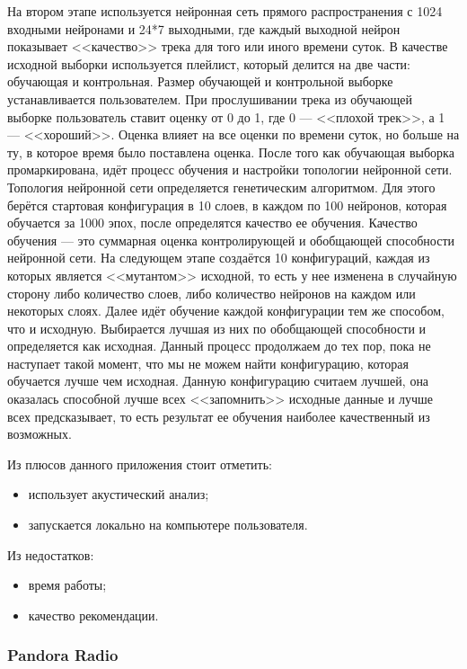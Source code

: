 На втором этапе используется нейронная сеть прямого распространения с 1024 входными нейронами и 24*7 выходными, где каждый выходной нейрон показывает <<качество>> трека для того или иного времени суток.  В качестве исходной выборки используется плейлист, который делится на две части: обучающая и контрольная. Размер обучающей и контрольной выборке устанавливается пользователем. При прослушивании трека из обучающей выборке пользователь ставит оценку от 0 до 1, где 0 — <<плохой трек>>, а 1 — <<хороший>>. Оценка влияет на все оценки по времени суток, но больше на ту, в которое время было поставлена оценка.  После того как обучающая выборка промаркирована, идёт процесс обучения и настройки топологии нейронной сети. Топология нейронной сети  определяется генетическим алгоритмом. Для этого берётся стартовая конфигурация в 10 слоев, в каждом по 100 нейронов, которая обучается за 1000 эпох, после определятся качество ее обучения. Качество обучения — это суммарная оценка контролирующей и обобщающей способности нейронной сети. На следующем этапе создаётся 10 конфигураций, каждая из которых является <<мутантом>> исходной, то есть у нее изменена в случайную сторону либо количество слоев, либо количество нейронов на каждом или некоторых слоях. Далее идёт обучение каждой конфигурации тем же способом, что и исходную. Выбирается лучшая из них по обобщающей способности  и определяется как исходная. Данный процесс продолжаем до тех пор, пока не наступает такой момент, что мы не можем найти конфигурацию, которая обучается лучше чем исходная. Данную конфигурацию считаем лучшей, она оказалась способной лучше всех <<запомнить>> исходные данные и лучше всех предсказывает, то есть результат ее обучения наиболее качественный из возможных.





Из плюсов данного приложения стоит отметить:
\begin{itemize}
\item использует акустический анализ;
\item запускается локально на компьютере пользователя.
\end{itemize}

Из недостатков:
\begin{itemize}
\item время работы;
\item качество рекомендации.
\end{itemize}



\subsubsection {Pandora Radio}

